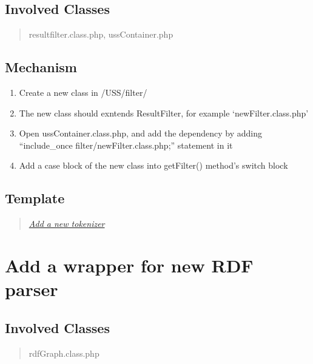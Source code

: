 \documentclass[letterpaper,10pt,english]{sphinxmanual}
\begin{document}
\subsection{Involved Classes}
\label{docs/hooks/new_filter:involved-classes}\begin{quote}

resultfilter.class.php, ussContainer.php
\end{quote}


\subsection{Mechanism}
\label{docs/hooks/new_filter:mechanism}\begin{enumerate}
\item {} 
Create a new class in /USS/filter/

\item {} 
The new class should exntends ResultFilter, for example `newFilter.class.php'

\item {} 
Open ussContainer.class.php, and add the dependency by adding ``include\_once filter/newFilter.class.php;'' statement in it

\item {} 
Add a case block of the new class into getFilter() method's switch block

\end{enumerate}


\subsection{Template}
\label{docs/hooks/new_filter:template}\begin{quote}

{\hyperref[docs/hooks/t_tokenizer:hook-template-uss]{\emph{Add a new tokenizer}}}
\end{quote}


\section{Add a wrapper for new RDF parser}
\label{docs/hooks/t_rdf_parser::doc}\label{docs/hooks/t_rdf_parser:hook-template-rdf-parser}\label{docs/hooks/t_rdf_parser:add-a-wrapper-for-new-rdf-parser}

\subsection{Involved Classes}
\label{docs/hooks/t_rdf_parser:involved-classes}\begin{quote}

rdfGraph.class.php
\end{quote}
\end{document}
